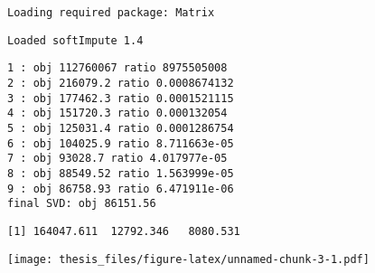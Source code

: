 \documentclass[12pt,twoside]{dukestatscithesis}
\theoremstyle{definition}
\theoremstyle{definition}
\theoremstyle{definition}
\theoremstyle{remark}
\begin{document}
\begin{verbatim}
Loading required package: Matrix
\end{verbatim}
\begin{verbatim}
Loaded softImpute 1.4
\end{verbatim}
\begin{Shaded}
\begin{Highlighting}[]
\StringTok{ }\NormalTok{,}\NormalTok{,}\NormalTok{,}\NormalTok{)}
\end{Highlighting}
\end{Shaded}
\begin{verbatim}
1 : obj 112760067 ratio 8975505008 
2 : obj 216079.2 ratio 0.0008674132 
3 : obj 177462.3 ratio 0.0001521115 
4 : obj 151720.3 ratio 0.000132054 
5 : obj 125031.4 ratio 0.0001286754 
6 : obj 104025.9 ratio 8.711663e-05 
7 : obj 93028.7 ratio 4.017977e-05 
8 : obj 88549.52 ratio 1.563999e-05 
9 : obj 86758.93 ratio 6.471911e-06 
final SVD: obj 86151.56 
\end{verbatim}
\begin{Shaded}
\begin{Highlighting}[]
\end{Highlighting}
\end{Shaded}
\begin{verbatim}
[1] 164047.611  12792.346   8080.531
\end{verbatim}
\begin{Shaded}
\begin{Highlighting}[]
\StringTok{ }
\NormalTok{(ports_mean_matrix[!}\NormalTok{(ports_mean_matrix)], filled[!}\NormalTok{(ports_mean_matrix)])}
\end{Highlighting}
\end{Shaded}
\texttt{[image: thesis\_files/figure-latex/unnamed-chunk-3-1.pdf]}
\begin{Shaded}
\begin{Highlighting}[]
\NormalTok{(ports_mean_matrix[!}\NormalTok{(ports_mean_matrix)], filled[!}\NormalTok{(ports_mean_matrix)],}
      \NormalTok{(}\NormalTok{,}\NormalTok{), } \NormalTok{(}\NormalTok{,}\NormalTok{))}
\end{Highlighting}
\end{Shaded}
\end{document}
